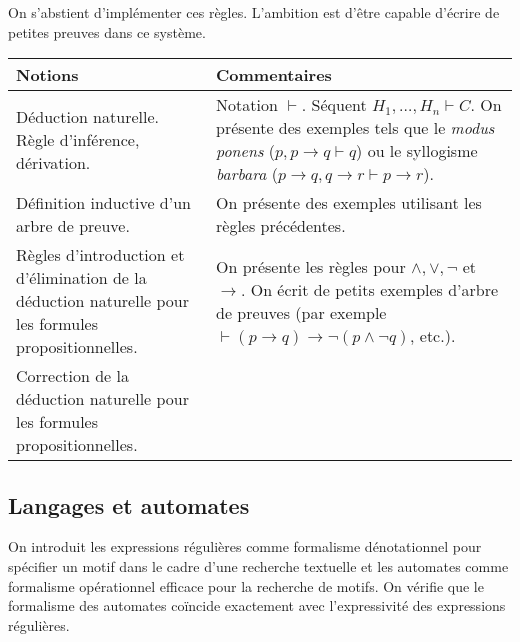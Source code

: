 On s'abstient d'implémenter ces règles. L'ambition est d'être capable d'écrire de petites preuves dans ce système. 


\begin{longtable}{|p{\lnotion}|p{\comment}|}
    \hline
    \textbf{Notions} & \textbf{Commentaires} \\
    \hline \hline
    Déduction naturelle. Règle d'inférence, dérivation. &
    Notation $\vdash$. Séquent $H_1,\dots,H_n
    \vdash C$. On présente des exemples tels que le \textit{modus ponens} ($p, p \rightarrow q \vdash q$) ou le syllogisme \textit{barbara} ($p \rightarrow q, q \rightarrow r \vdash p \rightarrow r$). 
\\
    Définition inductive d'un arbre de preuve. & On présente des exemples utilisant les règles précédentes. 
\\ 
    \hline
    Règles d'introduction et d'élimination de la déduction naturelle pour les
    formules propositionnelles. & 
    On présente les règles pour $\wedge, \vee, \neg$ et
    $\rightarrow$. On écrit de petits exemples d'arbre de preuves (par exemple $\vdash (p \rightarrow q) \rightarrow \neg (p \wedge \neg q) $, etc.).
 \\
    Correction de la déduction naturelle pour les formules propositionnelles. & 
\\
    \hline
\end{longtable}	


\subsection{Langages et automates}

On introduit les expressions régulières comme formalisme dénotationnel pour spécifier un motif dans le cadre d'une recherche textuelle et les automates comme formalisme opérationnel efficace pour la recherche de motifs. On vérifie que le formalisme des automates coïncide exactement avec l'expressivité des expressions régulières.

